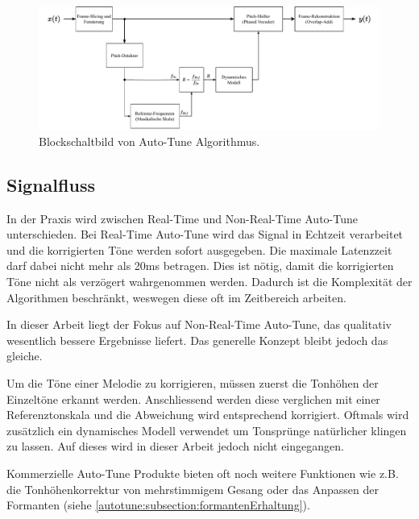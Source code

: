 \begin{figure}
	\centering
	\includegraphics[width=\textwidth]{papers/autotune/images/Blockdiagram.pdf}
	\caption{Blockschaltbild von Auto-Tune Algorithmus.}
    \label{autotune:fig:blockschaltbild}
\end{figure}


\subsection{Signalfluss}
\label{autotune:subsection:signalfluss}
In der Praxis wird zwischen Real-Time und Non-Real-Time Auto-Tune unterschieden.
Bei Real-Time Auto-Tune wird das Signal in Echtzeit verarbeitet und die korrigierten Töne werden sofort ausgegeben.
Die maximale Latenzzeit darf dabei nicht mehr als 20\;ms betragen.
Dies ist nötig, damit die korrigierten Töne nicht als verzögert wahrgenommen werden.
Dadurch ist die Komplexität der Algorithmen beschränkt, weswegen diese oft im Zeitbereich arbeiten.

In dieser Arbeit liegt der Fokus auf Non-Real-Time Auto-Tune, das qualitativ wesentlich bessere Ergebnisse liefert.
Das generelle Konzept bleibt jedoch das gleiche.

Um die Töne einer Melodie zu korrigieren, müssen zuerst die Tonhöhen der Einzeltöne erkannt werden.
Anschliessend werden diese verglichen mit einer Referenztonskala und die Abweichung wird entsprechend korrigiert.
Oftmals wird zusätzlich ein dynamisches Modell verwendet um Tonsprünge natürlicher klingen zu lassen.
Auf dieses wird in dieser Arbeit jedoch nicht eingegangen.

Kommerzielle Auto-Tune Produkte bieten oft noch weitere Funktionen wie z.B. die Tonhöhenkorrektur von mehrstimmigem Gesang oder das Anpassen der Formanten (siehe \ref{autotune:subsection:formantenErhaltung}).
